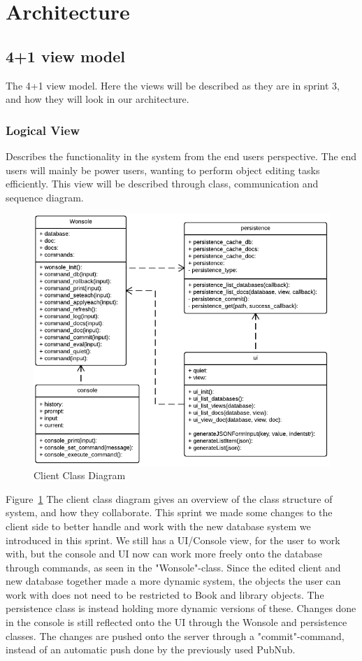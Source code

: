 \section{Architecture}

\subsection{4+1 view model}
The 4+1 view model\cite{Kruchten}. Here the views will be described as they are in sprint 3, and how they will look in our architecture. 

\subsubsection{Logical View}
Describes the functionality in the system from the end users perspective. The end users will mainly be power users, wanting to perform object editing tasks efficiently. This view will be described through class, communication and sequence diagram.

\begin{figure}[h]
\centering
\includegraphics[width=6in]{image/architecture/s3/s3clientClassDiagram.png}
\caption{Client Class Diagram}
\label{figure:s3clientClassDiagram}
\end{figure}

Figure~\ref{figure:s3clientClassDiagram} The client class diagram gives an overview of the class structure of system, and how they collaborate. This sprint we made some changes to the client side to better handle and work with the new database system we introduced in this sprint. We still has a UI/Console view, for the user to work with, but the console and UI now can work more freely onto the database through commands, as seen in the "Wonsole"-class. Since the edited client and new database together made a more dynamic system, the objects the user can work with does not need to be restricted to Book and library objects. The persistence class is instead holding more dynamic versions of these. Changes done in the console is still reflected onto the UI through the Wonsole and persistence classes. The changes are pushed onto the server through a "commit"-command, instead of an automatic push done by the previously used PubNub.

